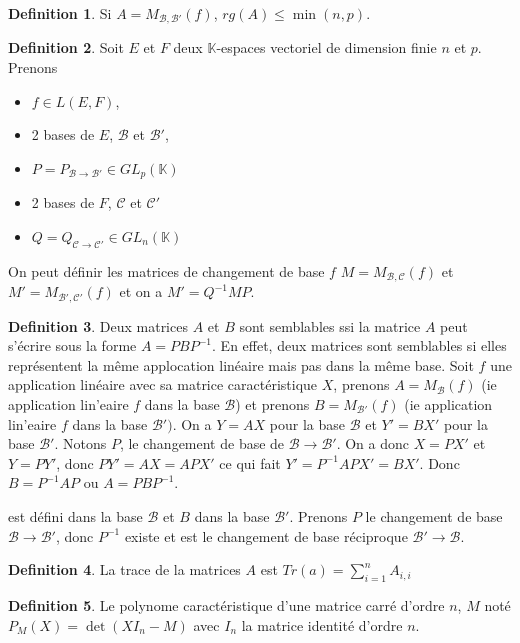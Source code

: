 \documentclass[]{book}
\theoremstyle{definition}
\newtheorem{defn}{Definition}
\newcommand{\bb}[1]{\mathbb{#1}}
\newcommand{\K}{\bb{K}}
\begin{document}
\begin{defn}
Si $A = M_{\mathcal{B}, \mathcal{B'}}(f)$, $rg(A) \leq \min(n,p)$. 
\end{defn}

\begin{defn}
Soit $E$ et $F$ deux $\K$-espaces vectoriel de dimension finie $n$ et $p$. Prenons 
\begin{itemize}
\item $f \in L(E,F)$, 
\item 2 bases de $E$, $\mathcal{B}$ et $\mathcal{B'}$,
\item $P = P_{\mathcal{B} \to \mathcal{B'}} \in GL_p(\K)$  
\item 2 bases de $F$, $\mathcal{C}$ et $\mathcal{C'}$
\item $Q = Q_{\mathcal{C} \to \mathcal{C'}} \in GL_n(\K)$  
\end{itemize}
On peut d\'efinir les matrices de changement de base $f$ $M=M_{\mathcal{B}, \mathcal{C}}(f)$ et $M'=M_{\mathcal{B'}, \mathcal{C'}}(f)$ et on a $M'=Q^{-1}MP$.
\end{defn}


\begin{defn}
Deux matrices $A$ et $B$ sont semblables ssi la matrice $A$ peut s'\'ecrire sous la forme $A = PBP^{-1}$. En effet, deux matrices sont semblables si elles repr\'esentent la m\^eme applocation lin\'eaire mais pas dans la m\^eme base. Soit $f$ une application lin\'eaire avec sa matrice caract\'eristique $X$, prenons $A= M_{\mathcal{B}}(f)$ (ie application lin'eaire $f$ dans la base $\mathcal{B}$) et prenons $B= M_{\mathcal{B'}}(f)$ (ie application lin'eaire $f$ dans la base $\mathcal{B'})$. On a $Y=AX$ pour la base $\mathcal{B}$ et $Y'=BX'$ pour la base $\mathcal{B'}$. Notons $P$, le changement de base de $\mathcal{B} \to \mathcal{B'}$. On a donc $X=PX'$ et $Y=PY'$, donc $PY' = AX = APX'$ ce qui fait $Y'=P^{-1}APX' = BX'$. Donc $B = P^{-1}AP$ ou $A = PBP^{-1}$.


 est d\'efini dans la base $\mathcal{B}$ et $B$ dans la base $\mathcal{B'}$. Prenons $P$ le changement de base $\mathcal{B} \to \mathcal{B'}$, donc $P^{-1}$ existe et est le changement de base r\'eciproque $\mathcal{B'} \to \mathcal{B}$. 
\end{defn}

\begin{defn}
La trace de la matrices $A$ est $Tr(a) = \sum_{i=1}^{n} A_{i,i}$
\end{defn}

\begin{defn}
Le polynome caract\'eristique d'une matrice carr\'e d'ordre $n$, $M$ not\'e $P_M(X) = \det(XI_n - M)$ avec $I_n$ la matrice identit\'e d'ordre $n$. 
\end{defn}
\end{document}
